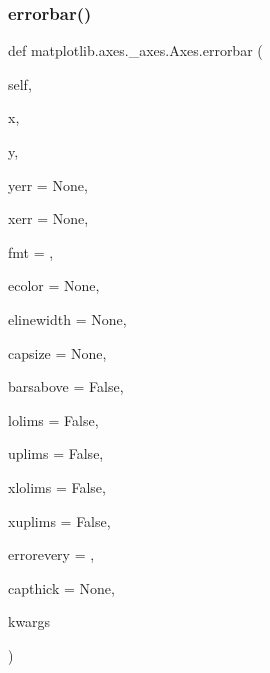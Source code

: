\subsubsection{\texorpdfstring{errorbar()}{errorbar()}}
{\footnotesize\ttfamily def matplotlib.\+axes.\+\_\+axes.\+Axes.\+errorbar (\begin{DoxyParamCaption}\item[{}]{self,  }\item[{}]{x,  }\item[{}]{y,  }\item[{}]{yerr = {\ttfamily None},  }\item[{}]{xerr = {\ttfamily None},  }\item[{}]{fmt = {\ttfamily \textquotesingle{}\textquotesingle{}},  }\item[{}]{ecolor = {\ttfamily None},  }\item[{}]{elinewidth = {\ttfamily None},  }\item[{}]{capsize = {\ttfamily None},  }\item[{}]{barsabove = {\ttfamily False},  }\item[{}]{lolims = {\ttfamily False},  }\item[{}]{uplims = {\ttfamily False},  }\item[{}]{xlolims = {\ttfamily False},  }\item[{}]{xuplims = {\ttfamily False},  }\item[{}]{errorevery = {},  }\item[{}]{capthick = {\ttfamily None},  }\item[{}]{kwargs }\end{DoxyParamCaption})}

